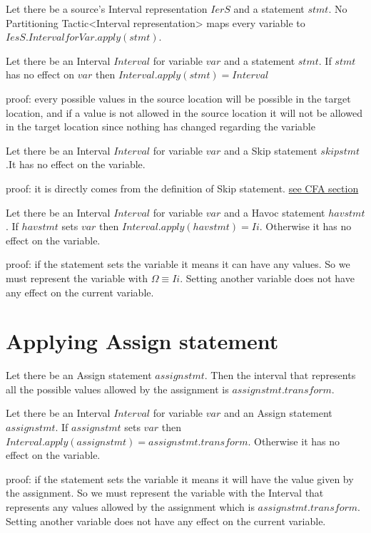 Let there be a source's Interval representation $IerS$ and a statement $stmt$. No Partitioning Tactic<Interval representation> maps every variable to $IesS.IntervalforVar.apply(stmt)$.

\begin{theorem}
	Let there be an Interval $Interval$ for variable $var$ and a statement $stmt$. If $stmt$ has no effect on $var$ then
	$Interval.apply(stmt)=Interval$ 
\end{theorem}

{proof: } every possible values in the source location will be possible in the target location, and if a value is not allowed in the source location it will not be allowed in the target location since nothing has changed regarding the variable

\begin{theorem}
	Let there be an Interval $Interval$ for variable $var$ and a Skip statement $skipstmt$.It has no effect on the variable.
\end{theorem}
{proof: }it is directly comes from the definition of Skip statement. \hyperref[sec:cfaleiras]{see CFA section}

\begin{theorem}
	Let there be an Interval $Interval$ for variable $var$ and a Havoc statement $havstmt$. If $havstmt$ sets $var$ then
	$Interval.apply(havstmt)=Ii$. Otherwise it has no effect on the variable.
\end{theorem}

{proof: } if the statement sets the variable it means it can have any values. So we must represent the variable with $\Omega \equiv Ii$. Setting another variable does not have any effect on the current variable.


\section{Applying Assign statement}


\begin{definition}
	Let there be an Assign statement $assignstmt$. Then the interval that represents all the possible values allowed by the assignment is $assignstmt.transform$.
\end{definition}

\begin{theorem}
	Let there be an Interval $Interval$ for variable $var$ and an Assign statement $assignstmt$. If $assignstmt$ sets $var$ then
	$Interval.apply(assignstmt)=assignstmt.transform$. Otherwise it has no effect on the variable.
\end{theorem}
{proof: } if the statement sets the variable it means it will have the value given by the assignment. So we must represent the variable with the Interval that represents any values allowed by the assignment which is $assignstmt.transform$. Setting another variable does not have any effect on the current variable.


